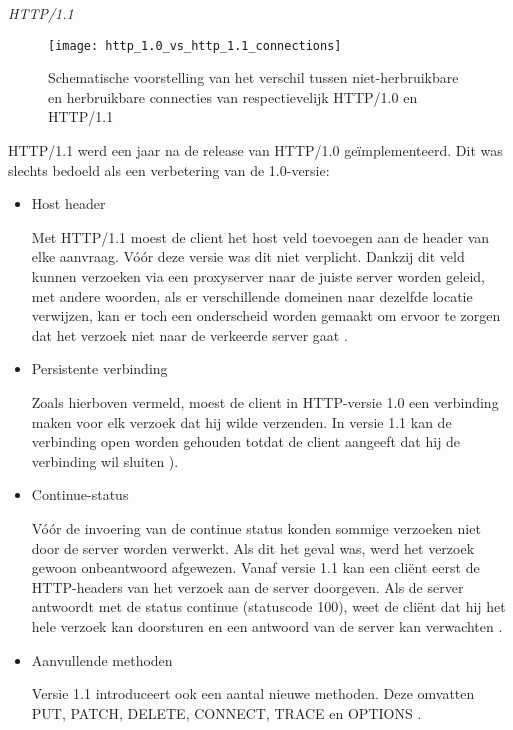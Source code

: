 \emph{HTTP/1.1}
\begin{figure}
    \texttt{[image: http\_1.0\_vs\_http\_1.1\_connections]}
    \centering
    \caption{Schematische voorstelling van het verschil tussen niet-herbruikbare en herbruikbare connecties van respectievelijk HTTP/1.0 en HTTP/1.1}
    \label{fig:httpConnectionScheme}
\end{figure}

HTTP/1.1 werd een jaar na de release van HTTP/1.0 geïmplementeerd. Dit was slechts bedoeld als een verbetering van de 1.0-versie:

\begin{itemize}
    \item Host header
    
    Met HTTP/1.1 moest de client het host veld toevoegen aan de header van elke aanvraag. Vóór deze versie was dit niet verplicht. Dankzij dit veld kunnen verzoeken via een proxyserver naar de juiste server worden geleid, met andere woorden, als er verschillende domeinen naar dezelfde locatie verwijzen, kan er toch een onderscheid worden gemaakt om ervoor te zorgen dat het verzoek niet naar de verkeerde server gaat \autocite{FulberGarcia2022}.
    
    \item Persistente verbinding
    
    Zoals hierboven vermeld, moest de client in HTTP-versie 1.0 een verbinding maken voor elk verzoek dat hij wilde verzenden. In versie 1.1 kan de verbinding open worden gehouden totdat de client aangeeft dat hij de verbinding wil sluiten \autocite{MDN2023a}).
    
    \item Continue-status
    
    Vóór de invoering van de continue status konden sommige verzoeken niet door de server worden verwerkt. Als dit het geval was, werd het verzoek gewoon onbeantwoord afgewezen. Vanaf versie 1.1 kan een cliënt eerst de HTTP-headers van het verzoek aan de server doorgeven. Als de server antwoordt met de status continue (statuscode 100), weet de cliënt dat hij het hele verzoek kan doorsturen en een antwoord van de server kan verwachten \autocite{FulberGarcia2022}.
    
    \item Aanvullende methoden
    
    Versie 1.1 introduceert ook een aantal nieuwe methoden. Deze omvatten PUT, PATCH, DELETE, CONNECT, TRACE en OPTIONS \autocite{FulberGarcia2022}.
\end{itemize}



